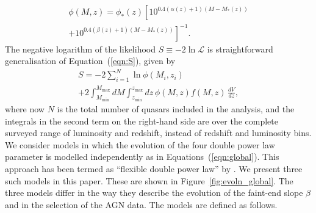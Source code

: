 \documentclass[a4paper,fleqn,usenatbib]{mnras}
\begin{document}
\begin{multline}
  \phi(M,z) = \phi_*(z) \left[10^{0.4(\alpha(z)+1)(M-M_*(z))}\right. \\ \left.+ 10^{0.4(\beta(z)+1)(M-M_*(z))}\right]^{-1}.
\end{multline}
The negative logarithm of the likelihood $S\equiv -2\ln\mathcal{L}$ is
straightforward generalisation of Equation~(\ref{eqn:S}), given by 
\begin{multline}
  S = -2\sum_{i=1}^N\ln\phi(M_i, z_i)\\+2\int_{M_\mathrm{min}}^{M_\mathrm{max}}dM\int_{z_\mathrm{min}}^{z_\mathrm{max}}dz\, \phi(M,z) f(M, z)\,\frac{dV}{dz},
  \label{eqn:S2}
\end{multline}
where now $N$ is the total number of quasars included in the analysis,
and the integrals in the second term on the right-hand side are over
the complete surveyed range of luminosity and redshift, instead of
redshift and luminosity bins.  We consider models in which the
evolution of the four double power law parameter is modelled
independently as in Equations~(\ref{eqn:global}).  This approach has
been termed as ``flexible double power law'' by
\citet{2015MNRAS.451.1892A}.  We present three such models in this
paper.  These are shown in Figure~\ref{fig:evoln_global}.  The three
models differ in the way they describe the evolution of the faint-end
slope $\beta$ and in the selection of the AGN data.  The models are
defined as follows.
\end{document}
